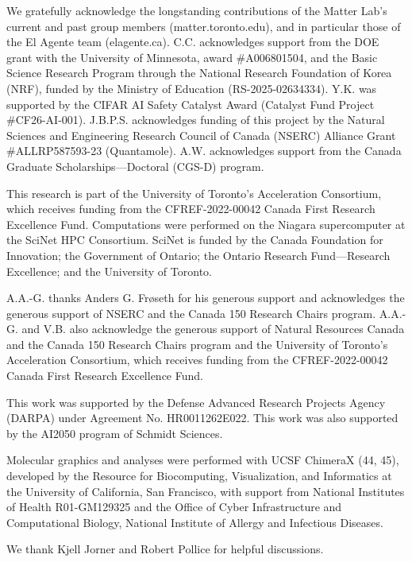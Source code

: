 We gratefully acknowledge the longstanding contributions of the Matter Lab’s current and past group members (matter.toronto.edu), and in particular those of the El Agente team (elagente.ca). C.C. acknowledges support from the DOE grant with the University of Minnesota, award #A006801504, and the Basic Science Research Program through the National Research Foundation of Korea (NRF), funded by the Ministry of Education (RS-2025-02634334). Y.K. was supported by the CIFAR AI Safety Catalyst Award (Catalyst Fund Project #CF26-AI-001). J.B.P.S. acknowledges funding of this project by the Natural Sciences and Engineering Research Council of Canada (NSERC) Alliance Grant #ALLRP587593-23 (Quantamole). A.W. acknowledges support from the Canada Graduate Scholarships—Doctoral (CGS-D) program.

This research is part of the University of Toronto’s Acceleration Consortium, which receives funding from the CFREF-2022-00042 Canada First Research Excellence Fund. Computations were performed on the Niagara supercomputer at the SciNet HPC Consortium. SciNet is funded by the Canada Foundation for Innovation; the Government of Ontario; the Ontario Research Fund—Research Excellence; and the University of Toronto.

A.A.-G. thanks Anders G. Frøseth for his generous support and acknowledges the generous support of NSERC and the Canada 150 Research Chairs program. A.A.-G. and V.B. also acknowledge the generous support of Natural Resources Canada and the Canada 150 Research Chairs program and the University of Toronto’s Acceleration Consortium, which receives funding from the CFREF-2022-00042 Canada First Research Excellence Fund.

This work was supported by the Defense Advanced Research Projects Agency (DARPA) under Agreement No. HR0011262E022. This work was also supported by the AI2050 program of Schmidt Sciences.

Molecular graphics and analyses were performed with UCSF ChimeraX (44, 45), developed by the Resource for Biocomputing, Visualization, and Informatics at the University of California, San Francisco, with support from National Institutes of Health R01-GM129325 and the Office of Cyber Infrastructure and Computational Biology, National Institute of Allergy and Infectious Diseases.

We thank Kjell Jorner and Robert Pollice for helpful discussions.

